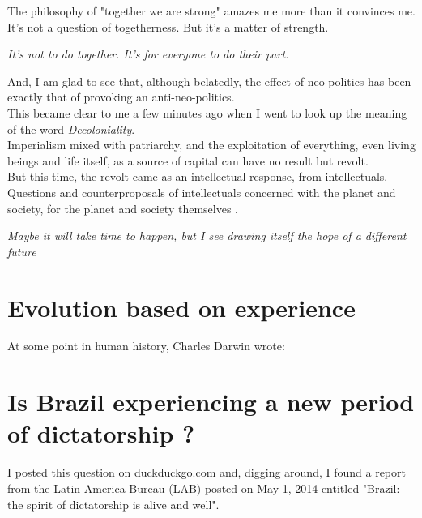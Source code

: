 \documentclass[11pt]{book}
\begin{document}
\noindent The philosophy of "together we are strong" amazes me more than it convinces me. \\

\noindent It's not a question of togetherness. But it's a matter of strength.

\noindent \begin{center} \emph{It's not to do together. It's for everyone to do their part.} \end{center} 

\noindent And, I am glad to see that, although belatedly, the effect of neo-politics has been exactly that of provoking an anti-neo-politics. \\

\noindent This became clear to me a few minutes ago when I went to look up the meaning of the word \emph{Decoloniality}. \\

\noindent Imperialism mixed with patriarchy, and the exploitation of everything, even living beings and life itself, as a source of capital can have no result but revolt. \\

\noindent But this time, the revolt came as an intellectual response, from intellectuals. \\

\noindent Questions and counterproposals of intellectuals concerned with the planet and society, for the planet and society themselves . \\

\noindent \begin{center} \emph{Maybe it will take time to happen, but I see drawing itself the hope of a different future} \end{center}

\chapter{Evolution based on experience}

At some point in human history, Charles Darwin wrote: 

\chapter{Is Brazil experiencing a new period of dictatorship ?}

\noindent I posted this question on duckduckgo.com and, digging around, I found a report from the Latin America Bureau (LAB) posted on May 1, 2014 entitled "Brazil: the spirit of dictatorship is alive and well". \\
\end{document}
